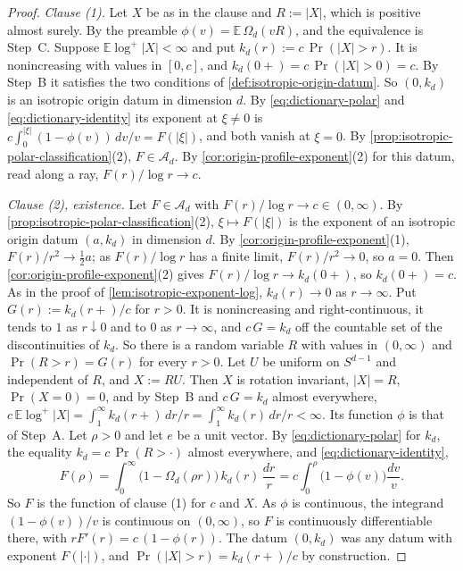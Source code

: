 \begin{proof}
\emph{Clause (1).} Let $X$ be as in the clause and $R := |X|$, which is positive almost surely.
By the preamble $\phi(v) = \mathbb{E}\,\Omega_d(vR)$, and the equivalence is Step~C. Suppose
$\mathbb{E}\log^+|X| < \infty$ and put $k_d(r) := c\,\Pr(|X| > r)$. It is nonincreasing with
values in $[0,c]$, and $k_d(0{+}) = c\,\Pr(|X| > 0) = c$. By Step~B it satisfies the two
conditions of \ref{def:isotropic-origin-datum}. So $(0,k_d)$ is an isotropic origin datum in
dimension $d$. By \ref{eq:dictionary-polar} and \ref{eq:dictionary-identity} its exponent at
$\xi \ne 0$ is $c\int_0^{|\xi|}(1 - \phi(v))\,dv/v = F(|\xi|)$, and both vanish at $\xi = 0$. By
\ref{prop:isotropic-polar-classification}(2), $F \in \mathcal{A}_d$. By
\ref{cor:origin-profile-exponent}(2) for this datum, read along a ray, $F(r)/\log r \to c$.

\emph{Clause (2), existence.} Let $F \in \mathcal{A}_d$ with $F(r)/\log r \to c \in (0,\infty)$.
By \ref{prop:isotropic-polar-classification}(2), $\xi \mapsto F(|\xi|)$ is the exponent of an
isotropic origin datum $(a,k_d)$ in dimension $d$. By \ref{cor:origin-profile-exponent}(1),
$F(r)/r^2 \to \tfrac12 a$; as $F(r)/\log r$ has a finite limit, $F(r)/r^2 \to 0$, so $a = 0$.
Then \ref{cor:origin-profile-exponent}(2) gives $F(r)/\log r \to k_d(0{+})$, so $k_d(0{+}) = c$.
As in the proof of \ref{lem:isotropic-exponent-log}, $k_d(r) \to 0$ as $r \to \infty$. Put
$G(r) := k_d(r{+})/c$ for $r > 0$. It is nonincreasing and right-continuous, it tends to $1$ as
$r \downarrow 0$ and to $0$ as $r \to \infty$, and $c\,G = k_d$ off the countable set of the
discontinuities of $k_d$. So there is a random variable $R$ with values in $(0,\infty)$ and
$\Pr(R > r) = G(r)$ for every $r > 0$. Let $U$ be uniform on $S^{d-1}$ and independent of $R$,
and $X := RU$. Then $X$ is rotation invariant, $|X| = R$, $\Pr(X = 0) = 0$, and by Step~B and
$c\,G = k_d$ almost everywhere,
$c\,\mathbb{E}\log^+|X| = \int_1^\infty k_d(r{+})\,dr/r = \int_1^\infty k_d(r)\,dr/r < \infty$.
Its function $\phi$ is that of
Step~A. Let $\rho > 0$ and let $e$ be a unit vector. By \ref{eq:dictionary-polar} for $k_d$, the
equality $k_d = c\,\Pr(R > \cdot)$ almost everywhere, and \ref{eq:dictionary-identity},
\[
  F(\rho) = \int_0^\infty\bigl(1 - \Omega_d(\rho r)\bigr)\,k_d(r)\,\frac{dr}{r}
   = c\int_0^\rho\bigl(1 - \phi(v)\bigr)\frac{dv}{v} .
\]
So $F$ is the function of clause (1) for $c$ and $X$. As $\phi$ is continuous, the integrand
$(1 - \phi(v))/v$ is continuous on $(0,\infty)$, so $F$ is continuously differentiable there, with
$rF'(r) = c\,(1 - \phi(r))$. The datum $(0,k_d)$ was any datum with exponent $F(|\cdot|)$, and
$\Pr(|X| > r) = k_d(r{+})/c$ by construction.


\end{proof}
